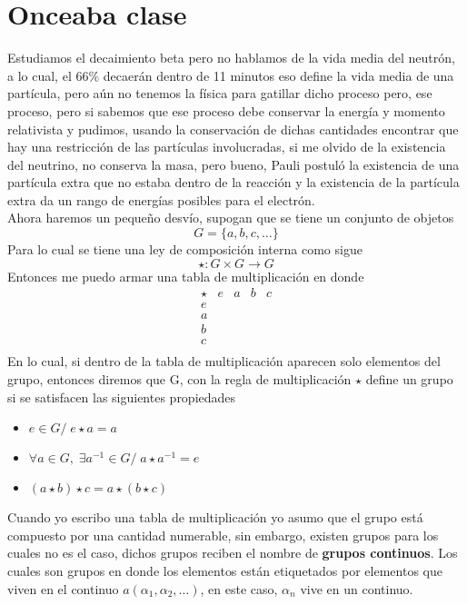 \documentclass[../main.tex]{subfiles}
\begin{document}
\section{Onceaba clase}
Estudiamos el decaimiento beta pero no hablamos de la vida media del neutrón, a lo cual, el 66$\%$ decaerán dentro de 11 minutos  eso define la vida media de una partícula, pero aún no tenemos la física para gatillar dicho proceso pero, ese proceso, pero si sabemos que ese proceso debe conservar la energía y momento relativista y pudimos, usando la conservación de dichas cantidades encontrar que hay una restricción de las partículas involucradas, si me olvido de la existencia del neutrino, no conserva la masa, pero bueno, Pauli postuló la existencia de una partícula extra que no estaba dentro de la reacción y la existencia de la partícula extra da un rango de energías posibles para el electrón. \\
Ahora haremos un pequeño desvío, supogan que se tiene un conjunto de objetos
\begin{equation}
  G = \{a,b,c,\dots\}
\end{equation}
Para lo cual se tiene una ley de composición interna como sigue
\begin{equation}
  \star : G\times G \longrightarrow G
\end{equation}
Entonces me puedo armar una tabla de multiplicación en donde
\begin{equation*}
\begin{array}{c|cccc}
  \star & e & a & b & c \\
  \hline
  e & \\
  a & \\
  b & \\
  c & \\
\end{array}
\end{equation*}
En lo cual, si dentro de la tabla de multiplicación aparecen solo elementos del grupo, entonces diremos que G, con la regla de multiplicación $\star$ define un grupo si se satisfacen las siguientes propiedades
\begin{itemize}
  \item $e\in G /\;e\star a=a$
  \item $\forall a \in G , \;\exists a^{-1}\in G / \; a\star a^{-1}=e$ 
  \item $(a\star b)\star c = a \star (b\star c) $ 
\end{itemize}
Cuando yo escribo una tabla de multiplicación yo asumo que el grupo está compuesto por una cantidad numerable, sin embargo, existen grupos para los cuales no es el caso, dichos grupos reciben el nombre de \textbf{grupos continuos}. Los cuales son grupos en donde los elementos están etiquetados por elementos que viven en el continuo $a(\alpha_1,\alpha_2,\dots)$, en este caso, $\alpha_n$ vive en un continuo. \\
\end{document}
